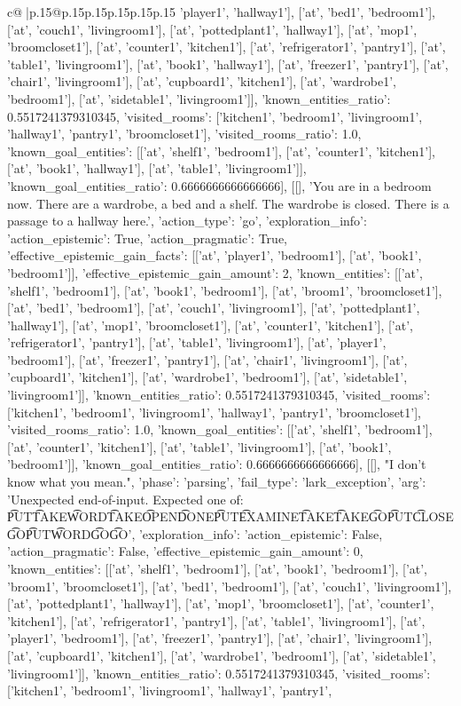 \documentclass{article}
\begin{document}
{\begin{supertabular}{c@{$\;$}|p{.15\linewidth}@{}p{.15\linewidth}p{.15\linewidth}p{.15\linewidth}p{.15\linewidth}p{.15\linewidth}}
{{{'player1', 'hallway1'], ['at', 'bed1', 'bedroom1'], ['at', 'couch1', 'livingroom1'], ['at', 'pottedplant1', 'hallway1'], ['at', 'mop1', 'broomcloset1'], ['at', 'counter1', 'kitchen1'], ['at', 'refrigerator1', 'pantry1'], ['at', 'table1', 'livingroom1'], ['at', 'book1', 'hallway1'], ['at', 'freezer1', 'pantry1'], ['at', 'chair1', 'livingroom1'], ['at', 'cupboard1', 'kitchen1'], ['at', 'wardrobe1', 'bedroom1'], ['at', 'sidetable1', 'livingroom1']], 'known_entities_ratio': 0.5517241379310345, 'visited_rooms': ['kitchen1', 'bedroom1', 'livingroom1', 'hallway1', 'pantry1', 'broomcloset1'], 'visited_rooms_ratio': 1.0, 'known_goal_entities': [['at', 'shelf1', 'bedroom1'], ['at', 'counter1', 'kitchen1'], ['at', 'book1', 'hallway1'], ['at', 'table1', 'livingroom1']], 'known_goal_entities_ratio': 0.6666666666666666}}], [[], 'You are in a bedroom now. There are a wardrobe, a bed and a shelf. The wardrobe is closed. There is a passage to a hallway here.', {'action_type': 'go', 'exploration_info': {'action_epistemic': True, 'action_pragmatic': True, 'effective_epistemic_gain_facts': [['at', 'player1', 'bedroom1'], ['at', 'book1', 'bedroom1']], 'effective_epistemic_gain_amount': 2, 'known_entities': [['at', 'shelf1', 'bedroom1'], ['at', 'book1', 'bedroom1'], ['at', 'broom1', 'broomcloset1'], ['at', 'bed1', 'bedroom1'], ['at', 'couch1', 'livingroom1'], ['at', 'pottedplant1', 'hallway1'], ['at', 'mop1', 'broomcloset1'], ['at', 'counter1', 'kitchen1'], ['at', 'refrigerator1', 'pantry1'], ['at', 'table1', 'livingroom1'], ['at', 'player1', 'bedroom1'], ['at', 'freezer1', 'pantry1'], ['at', 'chair1', 'livingroom1'], ['at', 'cupboard1', 'kitchen1'], ['at', 'wardrobe1', 'bedroom1'], ['at', 'sidetable1', 'livingroom1']], 'known_entities_ratio': 0.5517241379310345, 'visited_rooms': ['kitchen1', 'bedroom1', 'livingroom1', 'hallway1', 'pantry1', 'broomcloset1'], 'visited_rooms_ratio': 1.0, 'known_goal_entities': [['at', 'shelf1', 'bedroom1'], ['at', 'counter1', 'kitchen1'], ['at', 'table1', 'livingroom1'], ['at', 'book1', 'bedroom1']], 'known_goal_entities_ratio': 0.6666666666666666}}], [[], "I don't know what you mean.", {'phase': 'parsing', 'fail_type': 'lark_exception', 'arg': 'Unexpected end-of-input. Expected one of: \n\t* PUT\n\t* TAKE\n\t* WORD\n\t* TAKE\n\t* OPEN\n\t* DONE\n\t* PUT\n\t* EXAMINE\n\t* TAKE\n\t* TAKE\n\t* GO\n\t* PUT\n\t* CLOSE\n\t* GO\n\t* PUT\n\t* WORD\n\t* GO\n\t* GO\n', 'exploration_info': {'action_epistemic': False, 'action_pragmatic': False, 'effective_epistemic_gain_amount': 0, 'known_entities': [['at', 'shelf1', 'bedroom1'], ['at', 'book1', 'bedroom1'], ['at', 'broom1', 'broomcloset1'], ['at', 'bed1', 'bedroom1'], ['at', 'couch1', 'livingroom1'], ['at', 'pottedplant1', 'hallway1'], ['at', 'mop1', 'broomcloset1'], ['at', 'counter1', 'kitchen1'], ['at', 'refrigerator1', 'pantry1'], ['at', 'table1', 'livingroom1'], ['at', 'player1', 'bedroom1'], ['at', 'freezer1', 'pantry1'], ['at', 'chair1', 'livingroom1'], ['at', 'cupboard1', 'kitchen1'], ['at', 'wardrobe1', 'bedroom1'], ['at', 'sidetable1', 'livingroom1']], 'known_entities_ratio': 0.5517241379310345, 'visited_rooms': ['kitchen1', 'bedroom1', 'livingroom1', 'hallway1', 'pantry1', }}}
\end{supertabular}}
\end{document}
